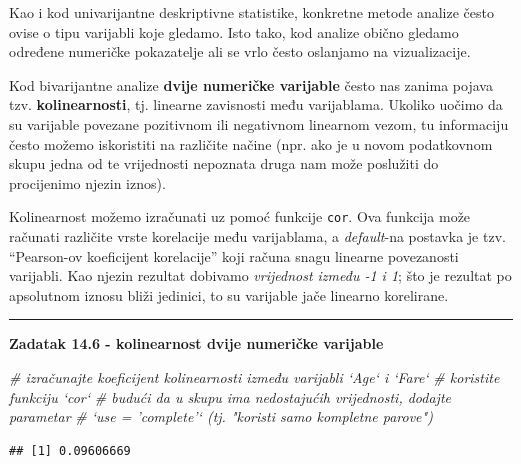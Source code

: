 \documentclass[]{book}
\newenvironment{Shaded}{\begin{snugshade}}{\end{snugshade}}
\newcommand{\KeywordTok}[1]{\textcolor[rgb]{0.13,0.29,0.53}{\textbf{#1}}}
\newcommand{\DataTypeTok}[1]{\textcolor[rgb]{0.13,0.29,0.53}{#1}}
\newcommand{\StringTok}[1]{\textcolor[rgb]{0.31,0.60,0.02}{#1}}
\newcommand{\CommentTok}[1]{\textcolor[rgb]{0.56,0.35,0.01}{\textit{#1}}}
\newcommand{\OperatorTok}[1]{\textcolor[rgb]{0.81,0.36,0.00}{\textbf{#1}}}
\newcommand{\NormalTok}[1]{#1}
\theoremstyle{definition}
\theoremstyle{definition}
\theoremstyle{definition}
\theoremstyle{remark}
\begin{document}
Kao i kod univarijantne deskriptivne statistike, konkretne metode
analize često ovise o tipu varijabli koje gledamo. Isto tako, kod
analize obično gledamo određene numeričke pokazatelje ali se vrlo često
oslanjamo na vizualizacije.

Kod bivarijantne analize \textbf{dvije numeričke varijable} često nas
zanima pojava tzv. \textbf{kolinearnosti}, tj. linearne zavisnosti među
varijablama. Ukoliko uočimo da su varijable povezane pozitivnom ili
negativnom linearnom vezom, tu informaciju često možemo iskoristiti na
različite načine (npr. ako je u novom podatkovnom skupu jedna od te
vrijednosti nepoznata druga nam može poslužiti do procijenimo njezin
iznos).

Kolinearnost možemo izračunati uz pomoć funkcije \texttt{cor}. Ova
funkcija može računati različite vrste korelacije među varijablama, a
\emph{default}-na postavka je tzv. ``Pearson-ov koeficijent korelacije''
koji računa snagu linearne povezanosti varijabli. Kao njezin rezultat
dobivamo \emph{vrijednost između -1 i 1}; što je rezultat po apsolutnom
iznosu bliži jedinici, to su varijable jače linearno korelirane.

\begin{center}\rule{0.5\linewidth}{\linethickness}\end{center}

\textbf{Zadatak 14.6 - kolinearnost dvije numeričke varijable}

\begin{Shaded}
\begin{Highlighting}[]
\CommentTok{# izračunajte koeficijent kolinearnosti između varijabli `Age` i `Fare`}
\CommentTok{# koristite funkciju `cor`}
\CommentTok{# budući da u skupu ima nedostajućih vrijednosti, dodajte parametar}
\CommentTok{#       `use = 'complete'`  (tj. "koristi samo kompletne parove")}
\end{Highlighting}
\end{Shaded}

\begin{Shaded}
\end{Shaded}

\begin{verbatim}
## [1] 0.09606669
\end{verbatim}
\end{document}

